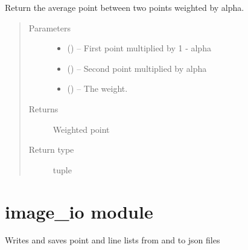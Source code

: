 \documentclass[letterpaper,10pt,english]{sphinxmanual}
\begin{document}
\begin{fulllineitems}
\label{\detokenize{image_helpers:image_helpers.weighted_average_point}}
Return the average point between two points weighted by alpha.
\begin{quote}\begin{description}
\item[{Parameters}] \leavevmode\begin{itemize}
\item {} 
 () -- First point multiplied by 1 - alpha

\item {} 
 () -- Second point multiplied by alpha

\item {} 
 () -- The weight.

\end{itemize}

\item[{Returns}] \leavevmode
Weighted point

\item[{Return type}] \leavevmode
tuple

\end{description}\end{quote}

\end{fulllineitems}



\chapter{image\_io module}
\label{\detokenize{image_io:module-image_io}}\label{\detokenize{image_io:image-io-module}}\label{\detokenize{image_io::doc}}
Writes and saves point and line lists from and to json files
\end{document}
